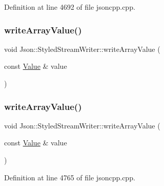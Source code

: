 Definition at line 4692 of file jsoncpp.\+cpp.

\hypertarget{class_json_1_1_styled_stream_writer_a606f2ddd58093c9b019d452c1b6f09fe}{}\label{class_json_1_1_styled_stream_writer_a606f2ddd58093c9b019d452c1b6f09fe} 
\subsubsection{\texorpdfstring{write\+Array\+Value()}{writeArrayValue()}\hspace{0.1cm}{\footnotesize\ttfamily [1/2]}}
{\footnotesize\ttfamily void Json\+::\+Styled\+Stream\+Writer\+::write\+Array\+Value (\begin{DoxyParamCaption}\item[{const \hyperlink{class_json_1_1_value}{Value} \&}]{value }\end{DoxyParamCaption})\hspace{0.3cm}{\ttfamily [private]}}

\hypertarget{class_json_1_1_styled_stream_writer_a606f2ddd58093c9b019d452c1b6f09fe}{}\label{class_json_1_1_styled_stream_writer_a606f2ddd58093c9b019d452c1b6f09fe} 
\subsubsection{\texorpdfstring{write\+Array\+Value()}{writeArrayValue()}\hspace{0.1cm}{\footnotesize\ttfamily [2/2]}}
{\footnotesize\ttfamily void Json\+::\+Styled\+Stream\+Writer\+::write\+Array\+Value (\begin{DoxyParamCaption}\item[{const \hyperlink{class_json_1_1_value}{Value} \&}]{value }\end{DoxyParamCaption})\hspace{0.3cm}{\ttfamily [private]}}



Definition at line 4765 of file jsoncpp.\+cpp.

\hypertarget{class_json_1_1_styled_stream_writer_ad2ca860e317ca91d6b2932535b4ce9c7}{}\label{class_json_1_1_styled_stream_writer_ad2ca860e317ca91d6b2932535b4ce9c7} 
